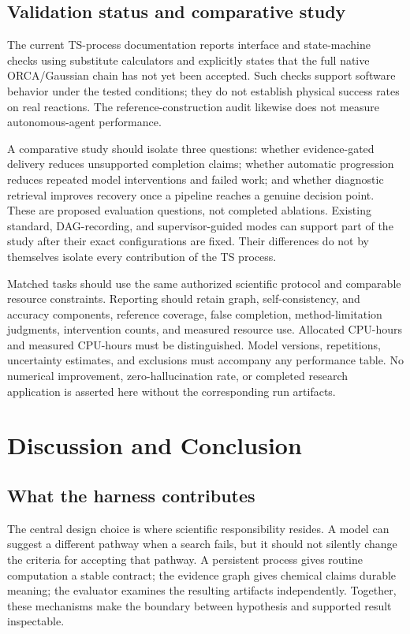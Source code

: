\documentclass[11pt,a4paper]{article}
\begin{document}
\subsection{Validation status and comparative study}
The current TS-process documentation reports interface and state-machine checks using substitute calculators and explicitly states that the full native ORCA/Gaussian chain has not yet been accepted. Such checks support software behavior under the tested conditions; they do not establish physical success rates on real reactions. The reference-construction audit likewise does not measure autonomous-agent performance.

A comparative study should isolate three questions: whether evidence-gated delivery reduces unsupported completion claims; whether automatic progression reduces repeated model interventions and failed work; and whether diagnostic retrieval improves recovery once a pipeline reaches a genuine decision point. These are proposed evaluation questions, not completed ablations. Existing standard, DAG-recording, and supervisor-guided modes can support part of the study after their exact configurations are fixed. Their differences do not by themselves isolate every contribution of the TS process.

Matched tasks should use the same authorized scientific protocol and comparable resource constraints. Reporting should retain graph, self-consistency, and accuracy components, reference coverage, false completion, method-limitation judgments, intervention counts, and measured resource use. Allocated CPU-hours and measured CPU-hours must be distinguished. Model versions, repetitions, uncertainty estimates, and exclusions must accompany any performance table. No numerical improvement, zero-hallucination rate, or completed research application is asserted here without the corresponding run artifacts.

\section{Discussion and Conclusion}

\subsection{What the harness contributes}
The central design choice is where scientific responsibility resides. A model can suggest a different pathway when a search fails, but it should not silently change the criteria for accepting that pathway. A persistent process gives routine computation a stable contract; the evidence graph gives chemical claims durable meaning; the evaluator examines the resulting artifacts independently. Together, these mechanisms make the boundary between hypothesis and supported result inspectable.
\end{document}
